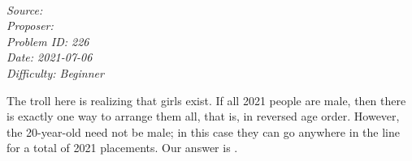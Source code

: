 \SSbreak\\
\emph{Source: \Cop}\\
\emph{Proposer: \Ptroll}\\ %
\emph{Problem ID: 226}\\
\emph{Date: 2021-07-06}\\
\emph{Difficulty: Beginner}\\
\SSbreak

\bigskip

\begin{solution}\hfil\medskip
	
	The troll here is realizing that girls exist. If all 2021 people are male, then there is 
	exactly one way to arrange them all, that is, in reversed age order. However, the 
	20-year-old need not be male; in this case they can go anywhere in the line for a total 
	of 2021 placements. Our answer is .
\end{solution}\bigskip
